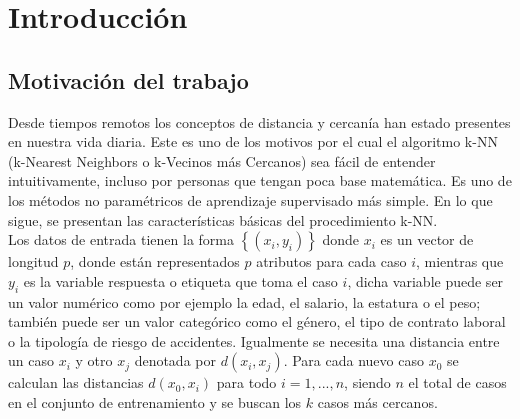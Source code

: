 \documentclass[12pt]{report} %
\theoremstyle{definition}
\begin{document}
\tableofcontents
\thispagestyle{fancy}

\newpage %
\thispagestyle{empty}
\mbox{}

\listoffigures
\thispagestyle{fancy}

\newpage %
\thispagestyle{empty}
\mbox{}

\listoftables
\thispagestyle{fancy}

\newpage %
\thispagestyle{empty}
\mbox{}

\clearpage
{} %

\chapter{Introducción}

\section{Motivación del trabajo}
Desde tiempos remotos los conceptos de distancia y cercanía han estado presentes en nuestra vida diaria. Este es uno de los motivos por el cual el algoritmo k-NN (k-Nearest Neighbors o k-Vecinos más Cercanos) sea fácil de entender intuitivamente, incluso por personas que tengan poca base matemática. Es uno de los métodos no paramétricos de aprendizaje supervisado más simple. En lo que sigue, se presentan las características básicas del procedimiento k-NN.\\

Los datos de entrada tienen la forma $\left\lbrace (x_i,y_i) \right\rbrace$ donde $x_i$ es un vector de longitud $p$, donde están representados $p$ atributos para cada caso $i$, mientras que $y_i$ es la variable respuesta o etiqueta que toma el caso $i$, dicha variable puede ser un valor numérico como por ejemplo la edad, el salario, la estatura o el peso; también puede ser un valor categórico como el género, el tipo de contrato laboral o la tipología de riesgo de accidentes. Igualmente se necesita una distancia entre un caso $x_i$ y otro $x_j$ denotada por $d(x_i,x_j)$. Para cada nuevo caso $x_{0}$ se calculan las distancias $d(x_0,x_i)$ para todo $i=1,...,n$, siendo $n$ el total de casos en el conjunto de entrenamiento y se buscan los $k$ casos más cercanos.
\end{document}
